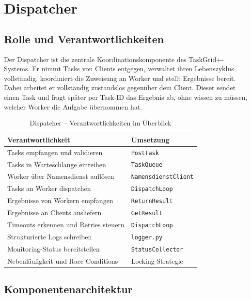 \section{Dispatcher}
\label{sec:dispatcher}

\subsection{Rolle und Verantwortlichkeiten}

Der Dispatcher ist die zentrale Koordinationskomponente des TaskGrid+{}-Systems.
Er nimmt Tasks von Clients entgegen, verwaltet ihren Lebenszyklus vollständig,
koordiniert die Zuweisung an Worker und stellt Ergebnisse bereit. Dabei arbeitet
er vollständig zustandslos gegenüber dem Client. Dieser sendet einen Task und
fragt später per Task-ID das Ergebnis ab, ohne wissen zu müssen, welcher Worker
die Aufgabe übernommen hat.

\begin{table}[H]
\centering
\begin{tabular}{ll}
\toprule
\textbf{Verantwortlichkeit} & \textbf{Umsetzung} \\
\midrule
Tasks empfangen und validieren             & \texttt{PostTask} \\
Tasks in Warteschlange einreihen           & \texttt{TaskQueue} \\
Worker über Namensdienst auflösen          & \texttt{NamensdienstClient} \\
Tasks an Worker dispatchen                 & \texttt{DispatchLoop} \\
Ergebnisse von Workern empfangen           & \texttt{ReturnResult} \\
Ergebnisse an Clients ausliefern           & \texttt{GetResult} \\
Timeouts erkennen und Retries steuern      & \texttt{DispatchLoop} \\
Strukturierte Logs schreiben               & \texttt{logger.py} \\
Monitoring-Status bereitstellen            & \texttt{StatusCollector} \\
Nebenläufigkeit und Race Conditions        & Locking-Strategie \\
\bottomrule
\end{tabular}
\caption{Dispatcher -- Verantwortlichkeiten im Überblick}
\end{table}

\subsection{Komponentenarchitektur}

